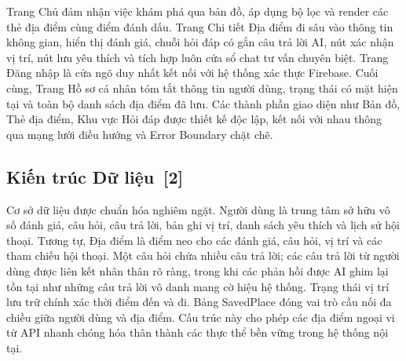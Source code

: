 \documentclass[12pt, a4paper]{article}
\begin{document}
Trang Chủ đảm nhận việc khám phá qua bản đồ, áp dụng bộ lọc và render các thẻ địa điểm cùng điểm đánh dấu. Trang Chi tiết Địa điểm đi sâu vào thông tin không gian, hiển thị đánh giá, chuỗi hỏi đáp có gắn câu trả lời AI, nút xác nhận vị trí, nút lưu yêu thích và tích hợp luôn cửa sổ chat tư vấn chuyên biệt. Trang Đăng nhập là cửa ngõ duy nhất kết nối với hệ thống xác thực Firebase. Cuối cùng, Trang Hồ sơ cá nhân tóm tắt thông tin người dùng, trạng thái có mặt hiện tại và toàn bộ danh sách địa điểm đã lưu. Các thành phần giao diện như Bản đồ, Thẻ địa điểm, Khu vực Hỏi đáp được thiết kế độc lập, kết nối với nhau thông qua mạng lưới điều hướng và Error Boundary chặt chẽ.

\subsection[Kiến trúc Dữ liệu]{Kiến trúc Dữ liệu \,{\normalfont\small\textcolor{cyan!70!black}{[2]}}}

Cơ sở dữ liệu được chuẩn hóa nghiêm ngặt. Người dùng là trung tâm sở hữu vô số đánh giá, câu hỏi, câu trả lời, bản ghi vị trí, danh sách yêu thích và lịch sử hội thoại. Tương tự, Địa điểm là điểm neo cho các đánh giá, câu hỏi, vị trí và các tham chiếu hội thoại. Một câu hỏi chứa nhiều câu trả lời; các câu trả lời từ người dùng được liên kết nhân thân rõ ràng, trong khi các phản hồi được AI ghim lại tồn tại như những câu trả lời vô danh mang cờ hiệu hệ thống. Trạng thái vị trí lưu trữ chính xác thời điểm đến và đi. Bảng SavedPlace đóng vai trò cầu nối đa chiều giữa người dùng và địa điểm. Cấu trúc này cho phép các địa điểm ngoại vi từ API nhanh chóng hóa thân thành các thực thể bền vững trong hệ thống nội tại.
\end{document}
